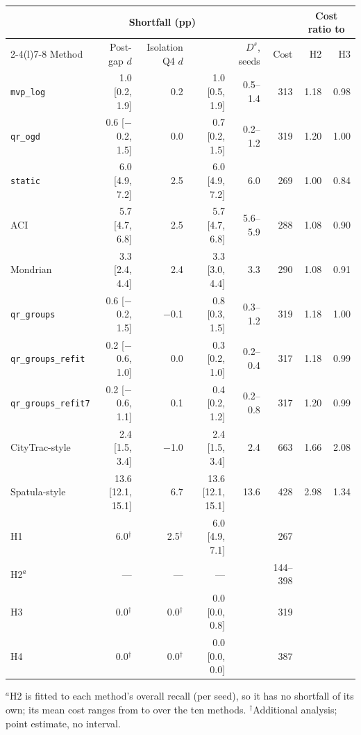 \setlength{\tabcolsep}{4.5pt}
\begin{tabular}{@{}lrrrrrrr@{}}
\toprule
 & \multicolumn{3}{c}{Shortfall (pp)} & & & \multicolumn{2}{c}{Cost ratio to} \\
\cmidrule(lr){2-4}\cmidrule(l){7-8}
Method & Post-gap $d$ & Isolation Q4 $d$ & \Dbar{} & $D^s$, seeds & Cost & H2 & H3 \\
\midrule
\texttt{mvp\_log} & 1.0 [0.2, 1.9] & 0.2 & 1.0 [0.5, 1.9] & 0.5--1.4 & 313 & 1.18 & 0.98 \\
\texttt{qr\_ogd} & 0.6 [$-$0.2, 1.5] & 0.0 & 0.7 [0.2, 1.5] & 0.2--1.2 & 319 & 1.20 & 1.00 \\
\addlinespace
\texttt{static} & 6.0 [4.9, 7.2] & 2.5 & 6.0 [4.9, 7.2] & 6.0 & 269 & 1.00 & 0.84 \\
ACI & 5.7 [4.7, 6.8] & 2.5 & 5.7 [4.7, 6.8] & 5.6--5.9 & 288 & 1.08 & 0.90 \\
Mondrian & 3.3 [2.4, 4.4] & 2.4 & 3.3 [3.0, 4.4] & 3.3 & 290 & 1.08 & 0.91 \\
\texttt{qr\_groups} & 0.6 [$-$0.2, 1.5] & $-$0.1 & 0.8 [0.3, 1.5] & 0.3--1.2 & 319 & 1.18 & 1.00 \\
\texttt{qr\_groups\_refit} & 0.2 [$-$0.6, 1.0] & 0.0 & 0.3 [0.2, 1.0] & 0.2--0.4 & 317 & 1.18 & 0.99 \\
\texttt{qr\_groups\_refit7} & 0.2 [$-$0.6, 1.1] & 0.1 & 0.4 [0.2, 1.2] & 0.2--0.8 & 317 & 1.20 & 0.99 \\
CityTrac-style & 2.4 [1.5, 3.4] & $-$1.0 & 2.4 [1.5, 3.4] & 2.4 & 663 & 1.66 & 2.08 \\
Spatula-style & 13.6 [12.1, 15.1] & 6.7 & 13.6 [12.1, 15.1] & 13.6 & 428 & 2.98 & 1.34 \\
\addlinespace
H1 & 6.0$^\dagger$ & 2.5$^\dagger$ & 6.0 [4.9, 7.1] & & 267 &  & \\
H2$^{a}$ & --- & --- & --- & & 144--398 &  & \\
H3 & 0.0$^\dagger$ & 0.0$^\dagger$ & 0.0 [0.0, 0.8] & & 319 &  & \\
H4 & 0.0$^\dagger$ & 0.0$^\dagger$ & 0.0 [0.0, 0.0] & & 387 &  & \\
\bottomrule
\end{tabular}

\smallskip\parbox{\textwidth}{\footnotesize $^{a}$H2 is fitted to each method's overall recall (per seed), so it has no shortfall of its own; its mean cost ranges from \ctwoHTwoCostMin{} to \ctwoHTwoCostMax{} over the ten methods. $^\dagger$Additional analysis; point estimate, no interval.}
